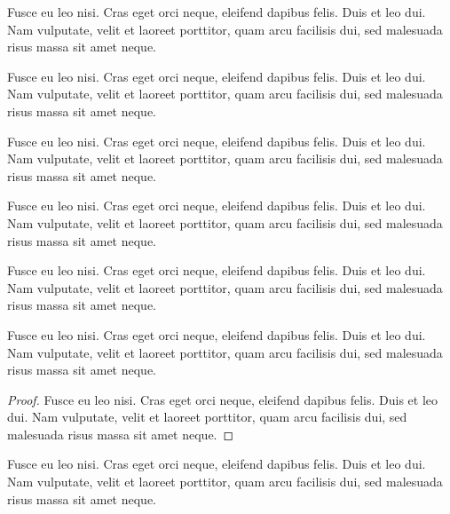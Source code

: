 \documentclass[a4paper,UKenglish,cleveref, autoref]{lipics-v2019}
\begin{document}
\begin{note}\label{testenv-note}
Fusce eu leo nisi. Cras eget orci neque, eleifend dapibus felis. Duis et leo dui. Nam vulputate, velit et laoreet porttitor, quam arcu facilisis dui, sed malesuada risus massa sit amet neque.
\end{note}

\begin{note*}
Fusce eu leo nisi. Cras eget orci neque, eleifend dapibus felis. Duis et leo dui. Nam vulputate, velit et laoreet porttitor, quam arcu facilisis dui, sed malesuada risus massa sit amet neque.
\end{note*}

\begin{remark}\label{testenv-remark}
Fusce eu leo nisi. Cras eget orci neque, eleifend dapibus felis. Duis et leo dui. Nam vulputate, velit et laoreet porttitor, quam arcu facilisis dui, sed malesuada risus massa sit amet neque.
\end{remark}

\begin{remark*}
Fusce eu leo nisi. Cras eget orci neque, eleifend dapibus felis. Duis et leo dui. Nam vulputate, velit et laoreet porttitor, quam arcu facilisis dui, sed malesuada risus massa sit amet neque.
\end{remark*}

\begin{claim}\label{testenv-claim}
Fusce eu leo nisi. Cras eget orci neque, eleifend dapibus felis. Duis et leo dui. Nam vulputate, velit et laoreet porttitor, quam arcu facilisis dui, sed malesuada risus massa sit amet neque.
\end{claim}

\begin{claim*}\label{testenv-claim2}
Fusce eu leo nisi. Cras eget orci neque, eleifend dapibus felis. Duis et leo dui. Nam vulputate, velit et laoreet porttitor, quam arcu facilisis dui, sed malesuada risus massa sit amet neque.
\end{claim*}

\begin{proof}
Fusce eu leo nisi. Cras eget orci neque, eleifend dapibus felis. Duis et leo dui. Nam vulputate, velit et laoreet porttitor, quam arcu facilisis dui, sed malesuada risus massa sit amet neque.
\end{proof}

\begin{claimproof}
Fusce eu leo nisi. Cras eget orci neque, eleifend dapibus felis. Duis et leo dui. Nam vulputate, velit et laoreet porttitor, quam arcu facilisis dui, sed malesuada risus massa sit amet neque.
\end{claimproof}
\end{document}
